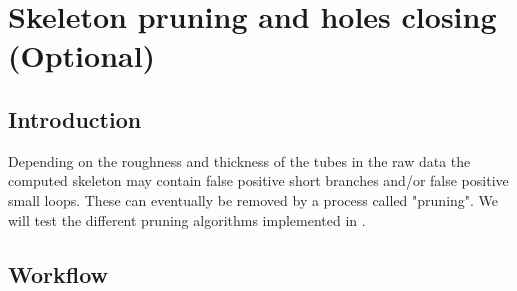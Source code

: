 \section{Skeleton pruning and holes closing (Optional)}

\subsection{Introduction}
Depending on the roughness and thickness of the tubes in the raw data the computed skeleton may contain false positive short branches and/or false positive small loops. These can eventually be removed by a process called "pruning". We will test the different pruning algorithms implemented in .

\subsection{Workflow}

